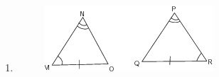 \begin{enumerate}[noitemsep, label=\textbf{\arabic*}. ]
\begin{enumerate}[noitemsep, label=\textbf{\alph*}. ]
\begin{figure}[H]
\begin{center}
{col11306.imgs/m39368_MG10C13_061.png} %
\vspace{2pt}
\vspace{.1in}
\end{center}
\end{figure}     
\item 
\setcounter{subfigure}{0}
\begin{figure}[H] %
\begin{center}
\label{m39368*id320548!!!underscore!!!media}\label{
m39368*id320548!!!underscore!!!printimage}\includegraphics{
col11306.imgs/m39368_MG10C13_062.png} %
\vspace{2pt}
\vspace{.1in}
\end{center}
\end{figure}       


\end{enumerate}
\end{enumerate}
